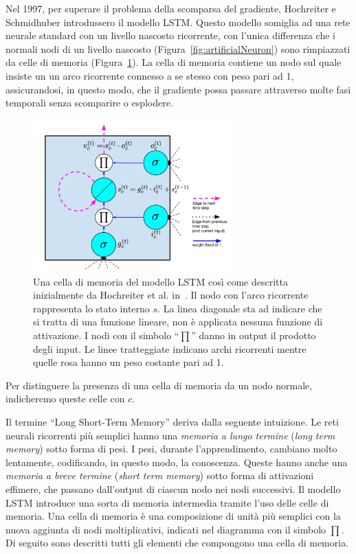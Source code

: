 Nel 1997, per superare il problema della scomparsa del gradiente, Hochreiter e
Schmidhuber introdussero il modello LSTM. Questo modello somiglia ad una rete
neurale standard con un livello nascosto ricorrente, con l'unica differenza che
i normali nodi di un livello nascosto (Figura~\ref{fig:artificialNeuron}) sono
rimpiazzati da celle di memoria (Figura~\ref{fig:memoryCell}). La cella di memoria
contiene un nodo sul quale insiste un un arco ricorrente connesso a se stesso con
peso pari ad 1, assicurandosi, in questo modo, che il gradiente possa passare
attraverso molte fasi temporali senza scomparire o esplodere.

\begin{figure}[tp]
  \centering
  \begin{center}
    \includegraphics[width=0.7\textwidth]{./images/memoryCell.png}
  \end{center}
  \caption{Una cella di memoria del modello LSTM cos\`i come descritta inizialmente
  da Hochreiter et al. in~\cite{Hochreiter:1997}. Il nodo con l'arco ricorrente
  rappresenta lo stato interno $s$. La linea diagonale sta ad indicare che si tratta
  di una funzione lineare, non \`e applicata nessuna funzione di attivazione.
  I nodi con il simbolo ``$\prod$'' danno in output il prodotto degli input.
  Le linee tratteggiate indicano archi ricorrenti mentre quelle rosa hanno un
  peso costante pari ad 1.}
  \label{fig:memoryCell}
\end{figure}

Per distinguere la presenza di una cella di memoria da un nodo normale,
indicheremo queste celle con $c$.

Il termine ``Long Short-Term Memory'' deriva dalla seguente intuizione.
Le reti neurali ricorrenti pi\`u semplici hanno una \emph{memoria a lungo termine}
(\emph{long term memory}) sotto forma di pesi. I pesi, durante l'apprendimento,
cambiano molto lentamente, codificando, in questo modo, la conoscenza. Queste
hanno anche una \emph{memoria a breve termine} (\emph{short term memory}) sotto
forma di attivazioni effimere, che passano dall'output di ciascun nodo nei nodi
successivi. Il modello LSTM introduce una sorta di memoria intermedia tramite
l'uso delle celle di memoria. Una cella di memoria \`e una composizione di unit\`a
pi\`u semplici con la nuova aggiunta di nodi moltiplicativi, indicati nel diagramma
con il simbolo $\prod$. Di seguito sono descritti tutti gli elementi che compongono
una cella di memoria.

